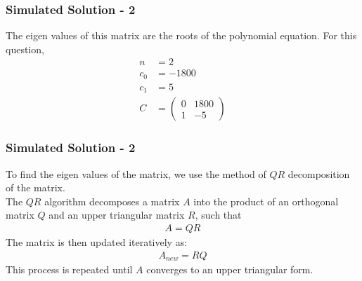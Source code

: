 \documentclass{beamer}
\theoremstyle{remark}
\newcommand{\myvec}[1]{\ensuremath{\begin{pmatrix}#1\end{pmatrix}}}
\numberwithin{equation}{section}
\begin{document}
\begin{frame}
      \frametitle{Simulated Solution - 2}

The eigen values of this matrix are the roots of the polynomial equation. For this question,
\begin{align}
	n &= 2\\
	c_0 &= -1800\\
	c_1 &= 5\\
	C &= \myvec{0 & 1800 \\ 1 & -5}
\end{align}
\end{frame}
\begin{frame}
	\frametitle{Simulated Solution - 2}
	To find the eigen values of the matrix, we use the method of $QR$ decomposition of the matrix.\\
The $QR$ algorithm decomposes a matrix $A$ into the product of an orthogonal matrix $Q$ and an upper triangular matrix $R$, such that
\begin{align}
	A = QR
\end{align}
The matrix is then updated iteratively as:
\begin{align}
	A_{new} = RQ
\end{align}
This process is repeated until $A$ converges to an upper triangular form.\\
\end{frame}
\end{document}
